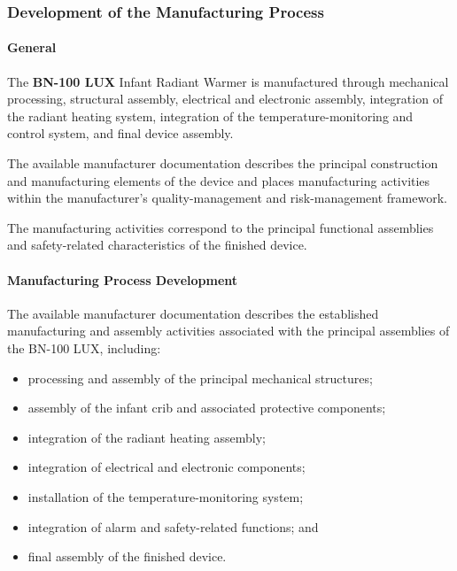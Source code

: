﻿

\hypertarget{p3-2-2-6}{}

\subsubsection{Development of the Manufacturing Process}

\paragraph{General}

The \textbf{BN-100 LUX} Infant Radiant Warmer is manufactured through
mechanical processing, structural assembly, electrical and electronic
assembly, integration of the radiant heating system, integration of
the temperature-monitoring and control system, and final device
assembly.

The available manufacturer documentation describes the principal
construction and manufacturing elements of the device and places
manufacturing activities within the manufacturer's quality-management
and risk-management framework.

The manufacturing activities correspond to the principal functional
assemblies and safety-related characteristics of the finished device.

\paragraph{Manufacturing Process Development}

The available manufacturer documentation describes the established
manufacturing and assembly activities associated with the principal
assemblies of the BN-100 LUX, including:

\begin{itemize}
    \item processing and assembly of the principal mechanical
    structures;
    \item assembly of the infant crib and associated protective
    components;
    \item integration of the radiant heating assembly;
    \item integration of electrical and electronic components;
    \item installation of the temperature-monitoring system;
    \item integration of alarm and safety-related functions; and
    \item final assembly of the finished device.
\end{itemize}

